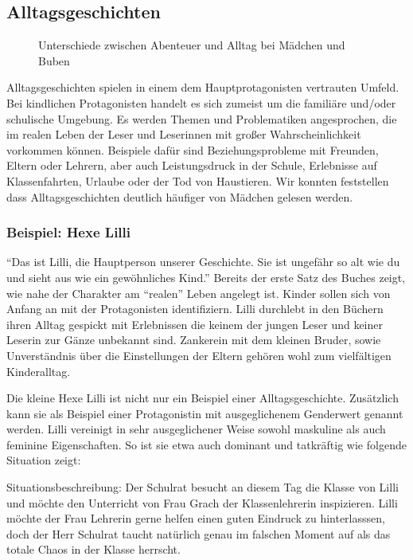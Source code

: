 

\subsection{Alltagsgeschichten}

\begin{figure}
\center
  \label{tab-abenteuer}
  \small

  \caption[Unterschiede zwischen Abenteuer und Alltag]{Unterschiede zwischen Abenteuer und Alltag bei Mädchen und Buben}
\end{figure}

Alltagsgeschichten spielen in einem dem Hauptprotagonisten vertrauten
Umfeld. Bei kindlichen Protagonisten handelt es sich zumeist um die
familiäre und/oder schulische Umgebung. Es werden Themen und
Problematiken angesprochen, die im realen Leben der Leser und Leserinnen
mit großer Wahrscheinlichkeit vorkommen können. Beispiele dafür sind
Beziehungsprobleme mit Freunden, Eltern oder Lehrern, aber auch
Leistungsdruck in der Schule, Erlebnisse auf Klassenfahrten, Urlaube
oder der Tod von Haustieren. Wir konnten feststellen dass
Alltagsgeschichten deutlich häufiger von Mädchen gelesen werden.

\subsubsection{Beispiel: Hexe Lilli}

``Das ist Lilli, die Hauptperson unserer Geschichte. Sie ist ungefähr so
alt wie du und sieht aus wie ein gewöhnliches Kind.''
\parencite[][6]{KNISTER1999} Bereits der erste Satz des Buches zeigt,
wie nahe der Charakter am ``realen'' Leben angelegt ist. Kinder sollen
sich von Anfang an mit der Protagonisten identifiziern. Lilli durchlebt
in den Büchern ihren Alltag gespickt mit Erlebnissen die keinem der
jungen Leser und keiner Leserin zur Gänze unbekannt sind. Zankerein mit
dem kleinen Bruder, sowie Unverständnis über die Einstellungen der
Eltern gehören wohl zum vielfältigen Kinderalltag.

Die kleine Hexe Lilli ist nicht nur ein Beispiel einer
Alltagsgeschichte. Zusätzlich kann sie als Beispiel einer Protagonistin
mit ausgeglichenem Genderwert genannt werden. Lilli vereinigt in sehr
ausgeglichener Weise sowohl maskuline als auch feminine Eigenschaften.
So ist sie etwa auch dominant und tatkräftig wie folgende Situation
zeigt:

Situationsbeschreibung: Der Schulrat besucht an diesem Tag die Klasse
von Lilli und möchte den Unterricht von Frau Grach der Klassenlehrerin
inspizieren. Lilli möchte der Frau Lehrerin gerne helfen einen guten
Eindruck zu hinterlasssen, doch der Herr Schulrat taucht natürlich genau
im falschen Moment auf als das totale Chaos in der Klasse herrscht.

